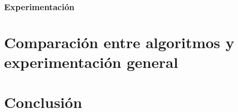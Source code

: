 \documentclass[a4paper, 10pt, twoside]{article}
\begin{document}
      \subsubsection{Experimentación}
      \label{subsub:algoritmos-heuristicos-grasp-experimentacion.tex}
      

\newpage



\section{Comparación entre algoritmos y experimentación general}
\label{sec:experimentacion-general}


\newpage


\section{Conclusión}
\label{sec:conclusion}


\newpage


\begin{appendices}



\end{appendices}
\end{document}
